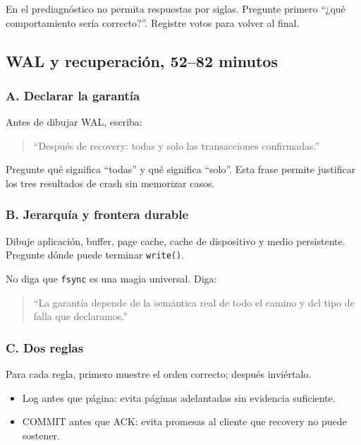 \documentclass[variant=docente,cover=institutional,mode=screen]{ua-engineering-v6-article}
\begin{document}
En el prediagnóstico no permita respuestas por siglas. Pregunte primero ``¿qué comportamiento sería correcto?''. Registre votos para volver al final.

\subsection{WAL y recuperación, 52--82 minutos}

\subsubsection*{A. Declarar la garantía}

Antes de dibujar WAL, escriba:

\begin{quote}
``Después de recovery: todas y solo las transacciones confirmadas.''
\end{quote}

Pregunte qué significa ``todas'' y qué significa ``solo''. Esta frase permite justificar los tres resultados de crash sin memorizar casos.

\subsubsection*{B. Jerarquía y frontera durable}

Dibuje aplicación, buffer, page cache, cache de dispositivo y medio persistente. Pregunte dónde puede terminar \texttt{write()}.

No diga que \texttt{fsync} es una magia universal. Diga:

\begin{quote}
``La garantía depende de la semántica real de todo el camino y del tipo de falla que declaramos.''
\end{quote}

\subsubsection*{C. Dos reglas}

Para cada regla, primero muestre el orden correcto; después inviértalo.

\begin{itemize}
\item Log antes que página: evita páginas adelantadas sin evidencia suficiente.
\item COMMIT antes que ACK: evita promesas al cliente que recovery no puede sostener.
\end{itemize}
\end{document}
